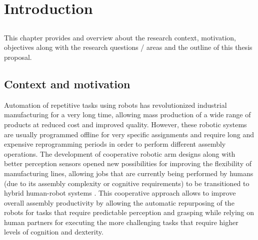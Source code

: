 \chapter{Introduction}\label{chap:introduction}



\section*{}

This chapter provides and overview about the research context, motivation, objectives along with the research questions / areas and the outline of this thesis proposal.



\section{Context and motivation}

Automation of repetitive tasks using robots has revolutionized industrial manufacturing for a very long time, allowing mass production of a wide range of products at reduced cost and improved quality. However, these robotic systems are usually programmed offline for very specific assignments and require long and expensive reprogramming periods in order to perform different assembly operations. The development of cooperative robotic arm designs along with better perception sensors opened new possibilities for improving the flexibility of manufacturing lines, allowing jobs that are currently being performed by humans (due to its assembly complexity or cognitive requirements) to be transitioned to hybrid human-robot systems \cite{Surdilovic2010}. This cooperative approach allows to improve overall assembly productivity by allowing the automatic repurposing of the robots for tasks that require predictable perception and grasping while relying on human partners for executing the more challenging tasks that require higher levels of cognition and dexterity.

